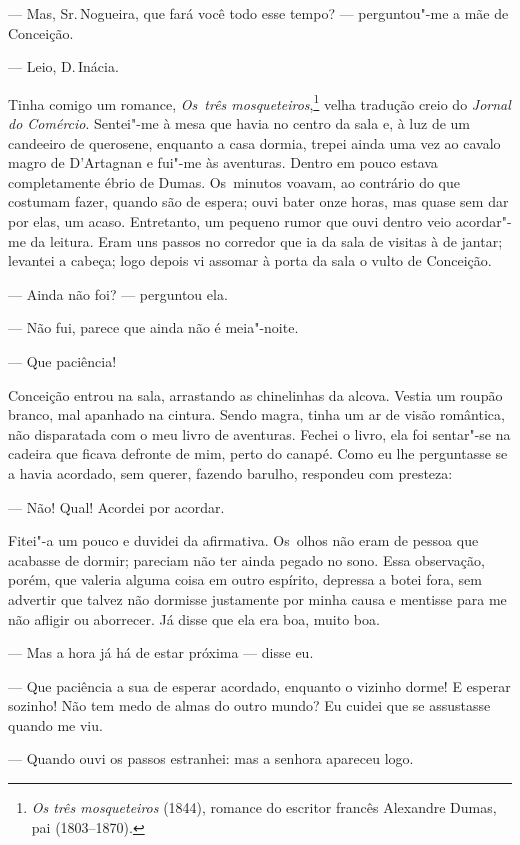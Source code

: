 \begin{linenumbers}
--- Mas, Sr.\,Nogueira, que fará você todo esse tempo? --- perguntou"-me a
mãe de Conceição.

--- Leio, D.\,Inácia.

Tinha comigo um romance, \emph{Os~três mosqueteiros},\footnote{\emph{Os
  três mosqueteiros} (1844), romance do escritor francês Alexandre
  Dumas, pai (1803--1870).} velha tradução creio do \emph{Jornal do
Comércio}. Sentei"-me à mesa que havia no centro da sala e, à luz de um
candeeiro de querosene, enquanto a casa dormia, trepei ainda uma vez ao
cavalo magro de D'Artagnan e fui"-me às aventuras. Dentro em pouco estava
completamente ébrio de Dumas. Os~minutos voavam, ao contrário do que
costumam fazer, quando são de espera; ouvi bater onze horas, mas quase
sem dar por elas, um acaso. Entretanto, um pequeno rumor que ouvi dentro
veio acordar"-me da leitura. Eram uns passos no corredor que ia da sala
de visitas à de jantar; levantei a cabeça; logo depois vi assomar à
porta da sala o vulto de Conceição.

--- Ainda não foi? --- perguntou ela.

--- Não fui, parece que ainda não é meia"-noite.

--- Que paciência!

Conceição entrou na sala, arrastando as chinelinhas da alcova. Vestia um
roupão branco, mal apanhado na cintura. Sendo magra, tinha um ar de
visão romântica, não disparatada com o meu livro de aventuras. Fechei o
livro, ela foi sentar"-se na cadeira que ficava defronte de mim, perto do
canapé. Como eu lhe perguntasse se a havia acordado, sem querer, fazendo
barulho, respondeu com presteza:

--- Não! Qual! Acordei por acordar.

Fitei"-a um pouco e duvidei da afirmativa. Os~olhos não eram de pessoa
que acabasse de dormir; pareciam não ter ainda pegado no sono. Essa
observação, porém, que valeria alguma coisa em outro espírito, depressa
a botei fora, sem advertir que talvez não dormisse justamente por minha
causa e mentisse para me não afligir ou aborrecer. Já disse que ela era
boa, muito boa.

--- Mas a hora já há de estar próxima --- disse eu.

--- Que paciência a sua de esperar acordado, enquanto o vizinho dorme! E
esperar sozinho! Não tem medo de almas do outro mundo? Eu cuidei que se
assustasse quando me viu.

--- Quando ouvi os passos estranhei: mas a senhora apareceu logo.


\end{linenumbers}
